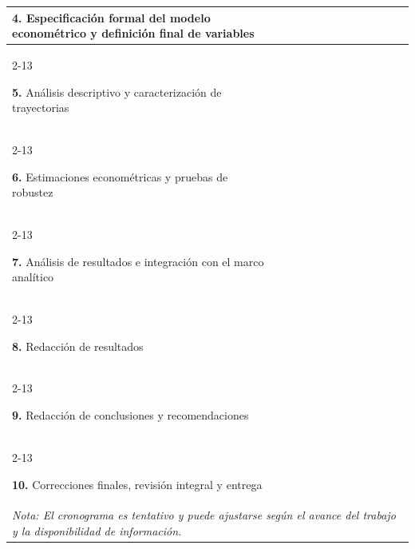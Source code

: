\documentclass[../../PTFM.tex]{subfiles}
\begin{document}
\begin{longtable}{|p{6.2cm}|*{12}{c|}}
		\textbf{4.} Especificación formal del modelo econométrico y definición final de variables
		&  &  & \cellcolor{gray!40} & \cellcolor{gray!40} &  &  &  &  &  &  &  &  \\
		\cline{2-13}

		\textbf{5.} Análisis descriptivo y caracterización de trayectorias
		&  &  & \cellcolor{gray!40} & \cellcolor{gray!40} & \cellcolor{gray!40} &  &  &  &  &  &  &  \\
		\cline{2-13}

		\textbf{6.} Estimaciones econométricas y pruebas de robustez
		&  &  &  & \cellcolor{gray!40} & \cellcolor{gray!40} & \cellcolor{gray!40} &  &  &  &  &  &  \\
		\cline{2-13}

		\textbf{7.} Análisis de resultados e integración con el marco analítico
		&  &  &  &  &  & \cellcolor{gray!40} & \cellcolor{gray!40} &  &  &  &  &  \\
		\cline{2-13}

		\textbf{8.} Redacción de resultados
		&  &  &  &  &  & \cellcolor{gray!40} & \cellcolor{gray!40} & \cellcolor{gray!40} &  &  &  &  \\
		\cline{2-13}

		\textbf{9.} Redacción de conclusiones y recomendaciones
		&  &  &  &  &  &  &  & \cellcolor{gray!40} & \cellcolor{gray!40} &  &  &  \\
		\cline{2-13}

		\textbf{10.} Correcciones finales, revisión integral y entrega
		&  &  &  &  &  &  &  &  & \cellcolor{gray!40} & \cellcolor{gray!40} & \cellcolor{gray!40} &  \\

		\hline
		\multicolumn{13}{p{\textwidth}}{%
			\textit{Nota: El cronograma es tentativo y puede ajustarse según el avance del trabajo y la disponibilidad de información.}
		}

	\end{longtable}
\end{document}

